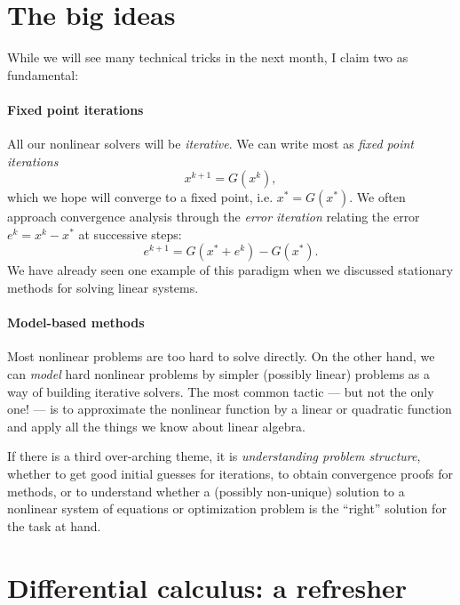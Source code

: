 \documentclass[12pt, leqno]{article} %
\begin{document}
\section*{The big ideas}

While we will see many technical tricks in the next month, I claim
two as fundamental:

\paragraph{Fixed point iterations}
All our nonlinear solvers will be {\em iterative}.
We can write most as {\em fixed point iterations}
\begin{equation}
  x^{k+1} = G(x^k), \label{eq:fixed-point}
\end{equation}
which we hope will converge to a fixed point, i.e. $x^* = G(x^*)$.
We often approach convergence analysis through the
{\em error iteration} relating the error $e^k = x^k-x^*$ at
successive steps:
\begin{equation}
  e^{k+1} = G(x^* + e^k)-G(x^*).
\end{equation}
We have already seen one example of this paradigm when we discussed
stationary methods for solving linear systems.

\paragraph{Model-based methods}
Most nonlinear problems are too hard to solve directly.  On the other
hand, we can {\em model} hard nonlinear problems by simpler (possibly
linear) problems as a way of building iterative solvers.  The most
common tactic --- but not the only one! --- is to approximate the
nonlinear function by a linear or quadratic function and apply all the
things we know about linear algebra.

\vspace{5mm}
If there is a third over-arching theme, it is
{\em understanding problem structure}, whether to get good initial
guesses for iterations, to obtain convergence proofs for methods,
or to understand whether a (possibly non-unique) solution to a
nonlinear system of equations or optimization problem is the ``right''
solution for the task at hand.

\section*{Differential calculus: a refresher}
\end{document}
